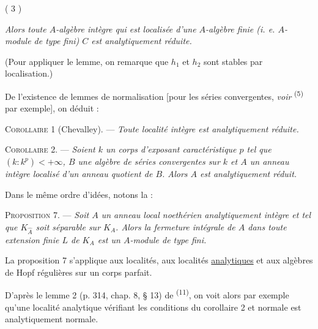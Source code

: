\begin{center}( 3 )\end{center}

\textit{Alors toute $A$-algèbre intègre qui est localisée d'une $A$-algèbre finie (i. e. $A$-module de type fini) $C$ est analytiquement réduite.}

(Pour appliquer le lemme, on remarque que $h_1$ et $h_2$ sont stables par localisation.)

De l'existence de lemmes de normalisation [pour les séries convergentes, \textit{voir} \textsuperscript{(5)} par exemple], on déduit :

\textsc{Corollaire 1} (Chevalley). --- \textit{Toute localité intègre est analytiquement réduite.}

\textsc{Corollaire 2.} --- \textit{Soient $k$ un corps d'exposant caractéristique $p$ tel que $(k:k^p)<+\infty$, $B$ une algèbre de séries convergentes sur $k$ et $A$ un anneau intègre localisé d'un anneau quotient de $B$. Alors $A$ est analytiquement réduit.}

Dans le même ordre d'idées, notons la :

\textsc{Proposition 7.} --- \textit{Soit $A$ un anneau local noethérien analytiquement intègre et tel que $K_{\widehat A}$ soit séparable sur $K_A$. Alors la fermeture intégrale de $A$ dans toute extension finie $L$ de $K_A$ est un $A$-module de type fini.}

La proposition 7 s'applique aux localités, aux localités \uline{analytiques} et aux algèbres de Hopf régulières sur un corps parfait.

D'après le lemme 2 (p. 314, chap. 8, § 13) de \textsuperscript{(11)}, on voit alors par exemple qu'une localité analytique vérifiant les conditions du corollaire 2 et normale est analytiquement normale.

